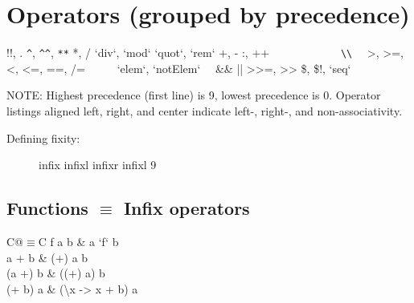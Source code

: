 \documentclass{refcard}
\newcommand{\la}{\textbackslash}
\begin{document}
\section{Operators (grouped by precedence)}

\begin{Ldesc}
	 !!, \hfill .
	 \hfill \verb+^+, \verb+^^+, \verb+**+
	 *, /
	 `div`, `mod`
	 `quot`, `rem`
	 +, -
	 \hfill :, ++
	                 ~~~~~~~~~~~~\verb+\\+
	\Li[comparisons:]     ~~>, >=, <, <=, ==, /=~~
	  ~~~`elem`, `notElem`~~
	 \hfill \&\&
	\Li[boolean or] \hfill ||
	 >{>}=, >{>}
	 \$, \$!, `seq`
\end{Ldesc}

\noindent
NOTE: Highest precedence (first line) is 9, lowest precedence is 0.  Operator
listings aligned left, right, and center indicate left-, right-, and
non-associativity.



\begin{description}
\item [Defining fixity:]
\begin{ldesc}
	 infix  
	 infixl  \I{+-+}
	 infixr  \I{-!-}
	 infixl 9
\end{ldesc}
\end{description}

\subsection{Functions $\equiv$ Infix operators}

\begin{tabular}{C@{\s$\equiv$\s}C}
	f a b & a `f` b \\
	a + b & (+) a b \\
	(a +) b & ((+) a) b \\
	(+ b) a & (\la{}x -> x + b) a \\
\end{tabular}
\end{document}
